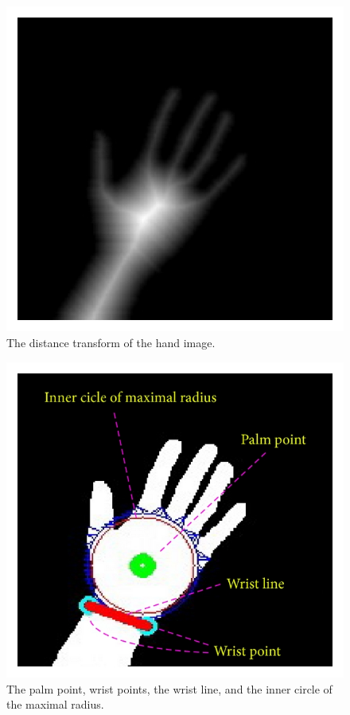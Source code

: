 \documentclass[a4paper]{article}
\begin{document}
\begin{figure}[h!]
 \begin{center}
  \includegraphics[scale=1.7]{fig4_c}
  \caption{The distance transform of the hand image.}
  \label{fig:The distance transform}
 \end{center}
\end{figure}


\begin{figure}[h!]
 \begin{center}
  \includegraphics[scale=1.7]{fig5}
  \caption{The palm point, wrist points, the wrist line, and the inner circle of the maximal radius.}
  \label{fig:The palm point}
 \end{center}
\end{figure}
\end{document}
